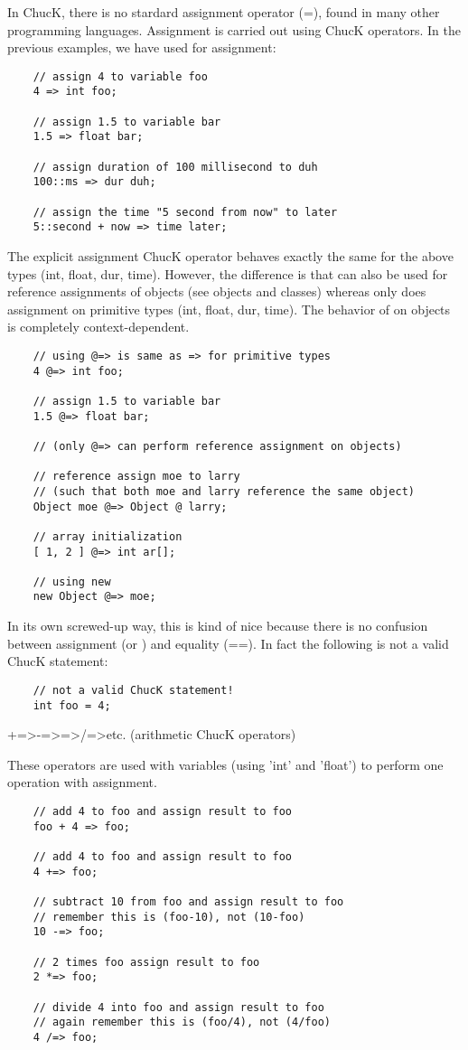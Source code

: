 In ChucK, there is no stardard assignment operator (=), found in many other programming languages. Assignment is carried out using ChucK operators. In the previous examples, we have used \chuckop for assignment:
\begin{verbatim}
    // assign 4 to variable foo
    4 => int foo;

    // assign 1.5 to variable bar
    1.5 => float bar;

    // assign duration of 100 millisecond to duh
    100::ms => dur duh;

    // assign the time "5 second from now" to later
    5::second + now => time later;
\end{verbatim}

The \atchuckop explicit assignment ChucK operator behaves exactly the same for the above types (int, float, dur, time). However, the difference is that \atchuckop can also be used for reference assignments of objects (see objects and classes) whereas \chuckop only does assignment on primitive types (int, float, dur, time). The behavior of \chuckop on objects is completely context-dependent.
\begin{verbatim}
    // using @=> is same as => for primitive types
    4 @=> int foo;

    // assign 1.5 to variable bar
    1.5 @=> float bar;

    // (only @=> can perform reference assignment on objects)

    // reference assign moe to larry
    // (such that both moe and larry reference the same object)
    Object moe @=> Object @ larry;

    // array initialization
    [ 1, 2 ] @=> int ar[];

    // using new
    new Object @=> moe;
\end{verbatim}

In its own screwed-up way, this is kind of nice because there is no confusion between assignment (\atchuckop or \chuckop) and equality (==). In fact the following is not a valid ChucK statement:
\begin{verbatim}
    // not a valid ChucK statement!
    int foo = 4;
\end{verbatim}


+=\textgreater -=\textgreater *=\textgreater /=\textgreater etc. (arithmetic ChucK operators)

These operators are used with variables (using 'int' and 'float') to perform one operation with assignment.
\begin{verbatim}
    // add 4 to foo and assign result to foo
    foo + 4 => foo;

    // add 4 to foo and assign result to foo
    4 +=> foo;

    // subtract 10 from foo and assign result to foo
    // remember this is (foo-10), not (10-foo)
    10 -=> foo;

    // 2 times foo assign result to foo
    2 *=> foo;

    // divide 4 into foo and assign result to foo
    // again remember this is (foo/4), not (4/foo)
    4 /=> foo;
\end{verbatim}

